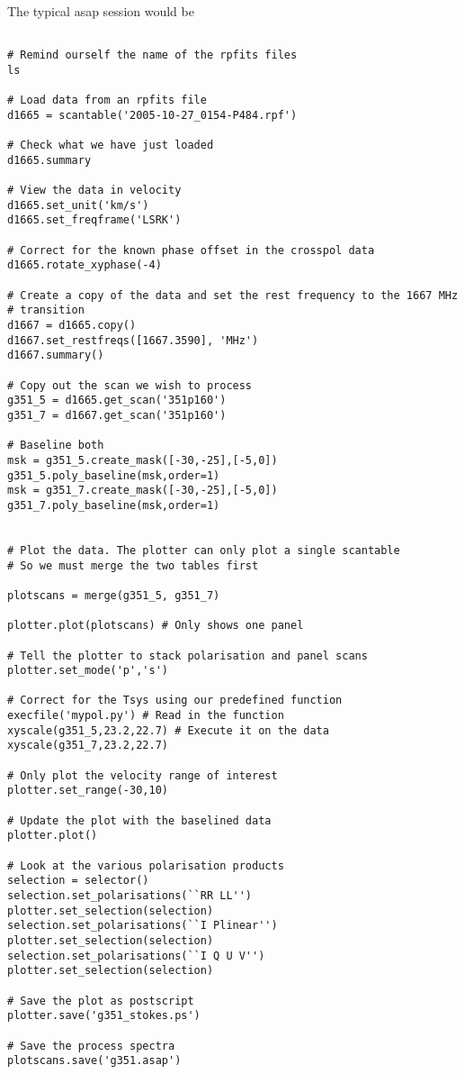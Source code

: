 \documentclass[11pt]{article}
\begin{document}
The typical asap session would be

\begin{verbatim}

# Remind ourself the name of the rpfits files
ls

# Load data from an rpfits file
d1665 = scantable('2005-10-27_0154-P484.rpf')

# Check what we have just loaded
d1665.summary

# View the data in velocity
d1665.set_unit('km/s')
d1665.set_freqframe('LSRK')

# Correct for the known phase offset in the crosspol data
d1665.rotate_xyphase(-4)

# Create a copy of the data and set the rest frequency to the 1667 MHz
# transition
d1667 = d1665.copy()
d1667.set_restfreqs([1667.3590], 'MHz')
d1667.summary()

# Copy out the scan we wish to process
g351_5 = d1665.get_scan('351p160')
g351_7 = d1667.get_scan('351p160')

# Baseline both
msk = g351_5.create_mask([-30,-25],[-5,0])
g351_5.poly_baseline(msk,order=1)
msk = g351_7.create_mask([-30,-25],[-5,0])
g351_7.poly_baseline(msk,order=1)


# Plot the data. The plotter can only plot a single scantable
# So we must merge the two tables first

plotscans = merge(g351_5, g351_7)

plotter.plot(plotscans) # Only shows one panel

# Tell the plotter to stack polarisation and panel scans
plotter.set_mode('p','s')

# Correct for the Tsys using our predefined function
execfile('mypol.py') # Read in the function
xyscale(g351_5,23.2,22.7) # Execute it on the data
xyscale(g351_7,23.2,22.7)

# Only plot the velocity range of interest
plotter.set_range(-30,10)

# Update the plot with the baselined data
plotter.plot()

# Look at the various polarisation products
selection = selector()
selection.set_polarisations(``RR LL'')
plotter.set_selection(selection)
selection.set_polarisations(``I Plinear'')
plotter.set_selection(selection)
selection.set_polarisations(``I Q U V'')
plotter.set_selection(selection)

# Save the plot as postscript
plotter.save('g351_stokes.ps')

# Save the process spectra
plotscans.save('g351.asap')

\end{verbatim}
\end{document}
